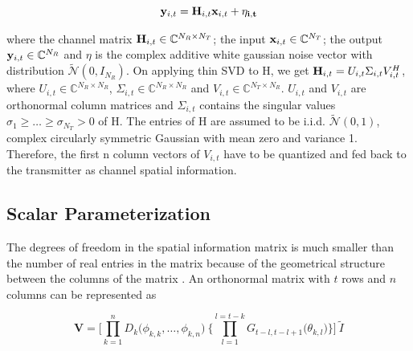 \documentclass[conference]{IEEEtran}
\begin{document}
\vspace{-1pt} 

\begin{equation} 
{\bf y}_{i,t} = {\bf H}_{i,t} {\bf x}_{i,t}+ \bf{\eta_{i,t}} 
\end{equation} 

\vspace{-1pt} 

where the channel matrix ${\bf H}_{i,t} \in \mathbb{C}^{N_R \times N_T}$; the input ${\bf x}_{i,t} \in \mathbb{C}^{N_T}$; the output ${\bf y}_{i,t} \in \mathbb{C}^{N_R}$ and $\eta$ is the complex additive white gaussian noise vector with distribution $\tilde{\mathcal{N}}(0,I_{N_R})$. On applying thin SVD to H, we get ${\bf H}_{i,t} = U_{i,t} \Sigma_{i,t} V_{i,t}^{H}$, where $U_{i,t} \in \mathbb{C}^{N_R \times N_R}$, $\Sigma_{i,t} \in \mathbb{C}^{N_R \times N_R}$  and $V_{i,t} \in \mathbb{C}^{N_T \times N_R}$. $U_{i,t}$ and $V_{i,t}$ are orthonormal column matrices and $\Sigma_{i,t}$ contains the singular values $\sigma_1 \geq \ldots \geq \sigma_{N_T} > 0$ of H. The entries of H are assumed to be i.i.d. $\tilde{\mathcal{N}}(0,1)$, complex circularly symmetric Gaussian with mean zero and variance 1. Therefore, the first n column vectors of $V_{i,t}$ have to be quantized and fed back to the transmitter as channel spatial information.


\subsection{Scalar Parameterization} 
\label{givens}

The degrees of freedom in the spatial information matrix is much smaller than the number of real entries in the matrix because of the geometrical structure between the columns of the matrix \cite{4114278}. An orthonormal matrix with $t$ rows and $n$ columns can be represented as 

  

\begin{equation} 
\textbf{V} = \Bigg[\prod_{k=1}^{n} D_{k} \big( \phi_{k,k},\ldots , \phi_{k,n} \big) \: \Bigg\{ \prod_{l=1}^{l=t-k} G_{t-l,t-l+1} \big( \theta_{k,l}\big) \Bigg\} \Bigg] \: \tilde{I} 
\end{equation} 
  
\end{document}

